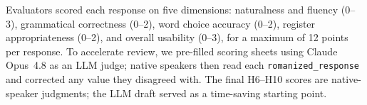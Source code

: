 Evaluators scored each response on five dimensions: naturalness and fluency
(0--3), grammatical correctness (0--2), word choice accuracy (0--2), register
appropriateness (0--2), and overall usability (0--3), for a maximum of 12
points per response. To accelerate review, we pre-filled scoring sheets using
Claude Opus~4.8 as an LLM judge; native speakers then read each
\texttt{romanized\_response} and corrected any value they disagreed with. The
final H6--H10 scores are native-speaker judgments; the LLM draft served as a
 time-saving starting point. %
